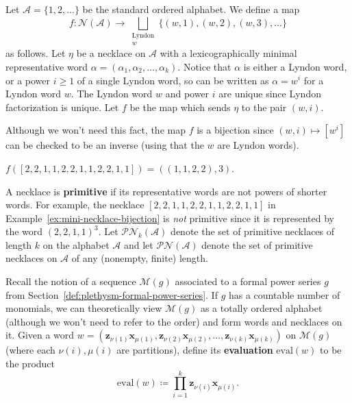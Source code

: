\documentclass[ALCO, Unicode]{cedram}
\begin{document}
\begin{defi}\label{lem:bijection-necklaces-to-lyndon-powers}
Let $\mathscr{A} = \{1, 2, \ldots\}$ be the standard ordered alphabet. We define a map  \[f:\mathscr{N}(\mathscr{A}) \longrightarrow \bigsqcup_{\substack{\text{Lyndon}\\ w}}\{(w, 1), (w, 2), (w, 3), \ldots\}\] as follows. Let $\eta$ be a necklace on $\mathscr{A}$ with a lexicographically minimal representative word $\alpha = (\alpha_1, \alpha_2, \ldots, \alpha_k).$ Notice that $\alpha$ is either a Lyndon word, or a power $i \geq 1$ of a single Lyndon word, so can be written as $\alpha = w^i$ for a Lyndon word $w$. The Lyndon word $w$ and power $i$ are unique since Lyndon factorization is unique.  Let $f$ be the map which sends $\eta$ to the pair $\left(w,i\right).$ 
\end{defi}

Although we won't need this fact, the map $f$ is a bijection since $(w, i) \mapsto [w^i]$ can be checked to be an inverse (using that the $w$ are Lyndon words). 

\begin{exam}\label{ex:mini-necklace-bijection}
$f\left([2, 2, 1, 1, 2, 2, 1, 1, 2, 2, 1, 1]\right)  = \left(\left(1,1,2, 2\right), 3\right).$
\end{exam}

A necklace is \textbf{primitive} if its representative words are not powers of shorter words. For example, the necklace $[2, 2, 1, 1, 2, 2, 1, 1, 2, 2, 1, 1]$ in Example~\ref{ex:mini-necklace-bijection} is \textit{not} primitive since it is represented by the word $(2, 2, 1, 1)^3.$  Let \textbf{$\mathscr{P}\mathscr{N}_k(\mathscr{A})$} denote the set of primitive necklaces of length $k$ on the alphabet $\mathscr{A}$  and let \textbf{$\mathscr{P}\mathscr{N}(\mathscr{A})$ }denote the set of primitive necklaces on $\mathscr{A}$ of any (nonempty, finite) length.

Recall the notion of a sequence $\mathcal{M}(g)$ associated to a formal power series $g$ from Section~\ref{def:plethysm-formal-power-series}. If $g$ has a countable number of monomials, we can theoretically view $\mathcal{M}(g)$ as a totally ordered alphabet (although we won't need to refer to the order) and form words and necklaces on it. Given a word $w= \left(\mathbf{z}_{\nu(1)}\mathbf{x}_{\mu(1)}, \mathbf{z}_{\nu(2)}\mathbf{x}_{\mu(2)},\ldots, \mathbf{z}_{\nu(k)}\mathbf{x}_{\mu(k)}\right)$ on $\mathcal{M}(g)$ (where each $\nu(i), \mu(i)$ are partitions), define its \textbf{evaluation} \textbf{$\mathrm{eval}(w)$} to be the product \[\mathrm{eval}(w)  \coloneqq  \prod_{i=1}^k\mathbf{z}_{\nu(i)}\mathbf{x}_{\mu(i)}.\]
\end{document}
